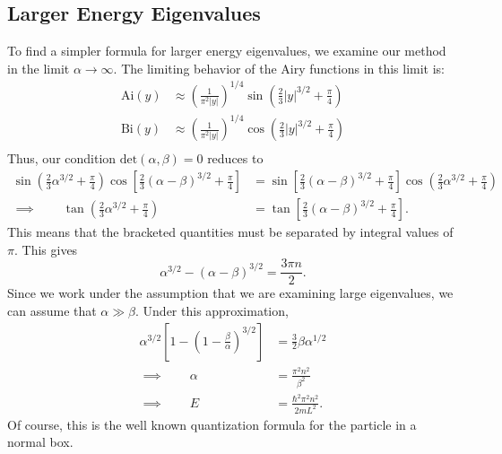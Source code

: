 \documentclass[12pt]{article}
\begin{document}
\subsection*{Larger Energy Eigenvalues}
To find a simpler formula for larger energy eigenvalues, we examine our method in the limit $\alpha \to \infty$.  The limiting behavior of the Airy functions in this limit is:
\begin{align*}
	\text{Ai}(y) & \approx \left( \frac{1}{\pi^2 |y|} \right)^{1/4} \sin\left( \frac{2}{3}|y|^{3/2} + \frac{\pi}{4} \right) \\
	\text{Bi}(y) & \approx \left( \frac{1}{\pi^2 |y|} \right)^{1/4} \cos\left( \frac{2}{3}|y|^{3/2} + \frac{\pi}{4} \right) \\
\end{align*}
Thus, our condition $\text{det}(\alpha,\beta) = 0$ reduces to
\begin{align*}
	\sin\left( \frac{2}{3}\alpha^{3/2} + \frac{\pi}{4} \right)\cos\left[ \frac{2}{3}(\alpha - \beta)^{3/2} + \frac{\pi}{4} \right] &= \sin\left[ \frac{2}{3} (\alpha - \beta)^{3/2} + \frac{\pi}{4} \right] \cos\left( \frac{2}{3}\alpha^{3/2} + \frac{\pi}{4} \right)\\
	\implies \qquad \tan\left( \frac{2}{3}\alpha^{3/2} + \frac{\pi}{4} \right) &= \tan\left[ \frac{2}{3}(\alpha - \beta)^{3/2} + \frac{\pi}{4} \right]. 
\end{align*}
This means that the bracketed quantities must be separated by integral values of $\pi$.  This gives
\[
	\alpha^{3/2} - (\alpha - \beta)^{3/2} = \frac{3\pi n}{2}.
\] 
Since we work under the assumption that we are examining large eigenvalues, we can assume that $\alpha \gg \beta$.  Under this approximation,
\begin{align*}
	\alpha^{3/2}\left[ 1 - \left( 1-\frac{\beta}{\alpha} \right)^{3/2} \right] &= \frac{3}{2}\beta \alpha^{1/2} \\
	\implies \qquad \alpha &= \frac{\pi^2 n^2}{\beta^2} \\
	\implies \qquad E &= \frac{\hbar^2 \pi^2 n^2}{2mL^2}.
\end{align*}
Of course, this is the well known quantization formula for the particle in a normal box.
\end{document}
